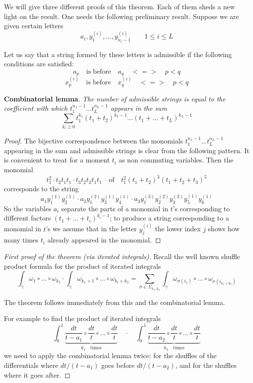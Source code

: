 \documentclass[10pt]{article}
\begin{document}
We will give three different proofs of this theorem. Each of them sheds a new 
light on the result. 
 One needs the following preliminary result. 
Suppose we are given certain letters
$$
a_i, y_1^{(i)}, ... , y_{n_i-1}^{(i)} \qquad 1 \leq i \leq L
$$

Let us say that a string formed by these letters is
admissible if the following conditions are satisfied:
$$
a_p \quad \mbox{is before} \quad a_q \quad <=> \quad p<q
$$
$$
x^{(i)}_p \quad \mbox{is before} \quad x^{(i)}_q \quad <=> \quad p<q
$$

{\bf Combinatorial lemma}. {\it The number of admissible strings
 is equal to the coefficient with which $t_1^{n_1-1}
 ... t_L^{n_L-1}$ appears in the sum}
$$
\sum_{k_i \geq 0} t_1^{k_1}(t_1+t_2)^{k_2-1}...(t_1+ ... + t_L)^{k_L-1} 
$$

\begin{proof} The bijective correspondence between the monomials 
$t_1^{n_1-1} ... t_L^{n_L-1}$ appearing in the sum and admissible
strings is clear from the following pattern. It is convenient to treat for a
moment $t_i$ as non commuting variables. Then the monomial
$$
t_1^2\cdot t_2 t_1 t_1 \cdot t_3 t_2 t_2 t_1 t_1 \quad \mbox{of}
\quad t_1^2(t_1+t_2)^3(t_1+t_2+t_3)^5
$$
corresponds to the string
$$
a_1 y_1^{(1)} y_2^{(1)}\cdot a_2 y_1^{(2)} y_3^{(1)} y_4^{(1)} \cdot a_3
        y_1^{(3)} y_2^{(2)} y_3^{(2)} y_5^{(1)}  y_6^{(1)}
$$
So the variables $a_i$ separate the parts of a monomial in $t$'s corresponding to different factors 
$(t_1+...+t_i)^{k_i-1}$; to produce a string corresponding to a monomial in $t$'s we assume that 
in the letter $y_j^{(i)}$ the lower index $j$ shows how many times $t_i$ already appeared in the monomial. 


\end{proof}

\begin{proof}[First proof of the theorem (via iterated integrals)] 
Recall the  well known  shuffle product formula for the product of iterated
integrals  
\begin{equation} \label{schprfo}
\int_{\gamma} \omega_{1} \circ ... \circ \omega_{k_1} \cdot \int_{\gamma}
\omega_{k_1+1} \circ ... \circ \omega_{k_l+k_2} = \sum_{\sigma \in \Sigma_{k_1,k_2}} \int_{\gamma} \omega_{\sigma(i_1)} \circ ... \circ \omega_{\sigma(i_{k_1 + k_2})}
\end{equation}
 

The  theorem follows immediately from this and the
combinatorial 
lemma.

For example to find the product of iterated integrals
$$
 \int_{0}^{1} \underbrace {\frac{dt}{t-a_{1}} \circ \frac{dt}{t} \circ ...
\circ \frac{dt}{t}}_{k_1 \quad  \mbox {times}} \quad \cdot \quad \int_{0}^{1} \underbrace {\frac{dt}{t-a_{2}} \circ \frac{dt}{t} \circ ...
\circ \frac{dt}{t}}_{k_2 \quad  \mbox {times}}
$$
we need to apply the combinatorial lemma twice: for the shuffles of the differentials where $dt/(t-a_1)$ goes before $dt/(t-a_2)$, and for the shuffles where it goes after. 


\end{proof}
\end{document}
